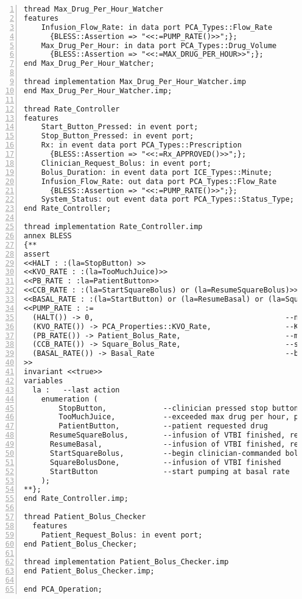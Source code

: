 \begin{lstlisting}[language=aadl, gobble=0, numbers=left, caption={\lstinline{PCA_Operation} package}, label={listing:aadl:pca_operation}]
thread Max_Drug_Per_Hour_Watcher
features
    Infusion_Flow_Rate: in data port PCA_Types::Flow_Rate 
      {BLESS::Assertion => "<<:=PUMP_RATE()>>";};    
    Max_Drug_Per_Hour: in data port PCA_Types::Drug_Volume
      {BLESS::Assertion => "<<:=MAX_DRUG_PER_HOUR>>";};  
end Max_Drug_Per_Hour_Watcher;

thread implementation Max_Drug_Per_Hour_Watcher.imp
end Max_Drug_Per_Hour_Watcher.imp;

thread Rate_Controller
features
	Start_Button_Pressed: in event port;
	Stop_Button_Pressed: in event port;
	Rx: in event data port PCA_Types::Prescription
	  {BLESS::Assertion => "<<:=Rx_APPROVED()>>";}; 
    Clinician_Request_Bolus: in event port;   
    Bolus_Duration: in event data port ICE_Types::Minute;  
    Infusion_Flow_Rate: out data port PCA_Types::Flow_Rate
      {BLESS::Assertion => "<<:=PUMP_RATE()>>";};   
    System_Status: out event data port PCA_Types::Status_Type;
end Rate_Controller;

thread implementation Rate_Controller.imp
annex BLESS
{**
assert
<<HALT : :(la=StopButton) >>  													--pump at 0 if stop button
<<KVO_RATE : :(la=TooMuchJuice)>>  												--pump at KVO rate when commanded, some alarms, or excedded hourly limit
<<PB_RATE : :la=PatientButton>>  												--patient button pressed, and allowed
<<CCB_RATE : :(la=StartSquareBolus) or (la=ResumeSquareBolus)>>  				--clinician-commanded bolus start or resumption after patient bolus
<<BASAL_RATE : :(la=StartButton) or (la=ResumeBasal) or (la=SquareBolusDone)>>  --regular infusion
<<PUMP_RATE : :=
  (HALT()) -> 0,                                 			--no flow
  (KVO_RATE()) -> PCA_Properties::KVO_Rate,      			--KVO rate
  (PB_RATE()) -> Patient_Bolus_Rate,						--maximum infusion upon patient request
  (CCB_RATE()) -> Square_Bolus_Rate,             			--square bolus rate=VTBI/duration, from data port
  (BASAL_RATE()) -> Basal_Rate                   			--basal rate, from data port
>>
invariant <<true>>
variables
  la :   --last action
    enumeration (	
    	StopButton,				--clinician pressed stop button
    	TooMuchJuice,     		--exceeded max drug per hour, pump at KVO until prescription and patient are re-authenticated
    	PatientButton,			--patient requested drug
      ResumeSquareBolus,		--infusion of VTBI finished, resume clinician-commanded bolus
      ResumeBasal,				--infusion of VTBI finished, resume basal-rate
      StartSquareBolus,			--begin clinician-commanded bolus
      SquareBolusDone,  		--infusion of VTBI finished
      StartButton				--start pumping at basal rate
    );
**};
end Rate_Controller.imp;

thread Patient_Bolus_Checker
  features
    Patient_Request_Bolus: in event port;
end Patient_Bolus_Checker;

thread implementation Patient_Bolus_Checker.imp
end Patient_Bolus_Checker.imp;

end PCA_Operation;
\end{lstlisting} 
\doublespacing
